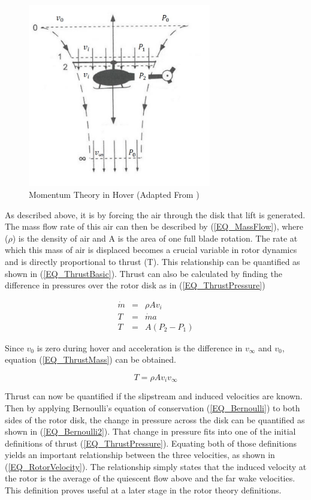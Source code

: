 \begin{figure}[h]
\centering
\includegraphics[height = 8cm, angle=360]{Images/Literature/MomentumTheoryHover}			%
\caption{Momentum Theory in Hover (Adapted From \cite{Leishman})}
\label{IM_MomentumTheoryHover}
\end{figure}

As described above, it is by forcing the air through the disk that lift is generated. The mass flow rate of this air can then be described by (\ref{EQ_MassFlow}), where ($\rho$) is the density of air and A is the area of one full blade rotation. The rate at which this mass of air is displaced becomes a crucial variable in rotor dynamics and is directly proportional to thrust (T). This relationship can be quantified as shown in (\ref{EQ_ThrustBasic}). Thrust can also be calculated by finding the difference in pressures over the rotor disk as in (\ref{EQ_ThrustPressure})

\begin{eqnarray}
\dot{m} &=& \rho A v_{i}\label{EQ_MassFlow}\\
T &=& \dot{m}a\label{EQ_ThrustBasic}\\
T &=& A(P_2 - P_1)\label{EQ_ThrustPressure}
\end{eqnarray}

Since $v_0$ is zero during hover and acceleration is the difference in $v_\infty$ and $v_0$, equation (\ref{EQ_ThrustMass}) can be obtained.

\begin{equation}
\label{EQ_ThrustMass}
T = \rho A v_{i} v_\infty
\end{equation}

Thrust can now be quantified if the slipstream and induced velocities are known. 
Then by applying Bernoulli's equation of conservation (\ref{EQ_Bernoulli}) to both sides of the rotor disk, the change in pressure across the disk can be quantified as shown in (\ref{EQ_Bernoulli2}).
That change in pressure fits into one of the initial definitions of thrust (\ref{EQ_ThrustPressure}). Equating both of those definitions yields an important relationship between the three velocities, as shown in (\ref{EQ_RotorVelocity}). The relationship simply states that the induced velocity at the rotor is the average of the quiescent flow above and the far wake velocities. This definition proves useful at a later stage in the rotor theory definitions. 

